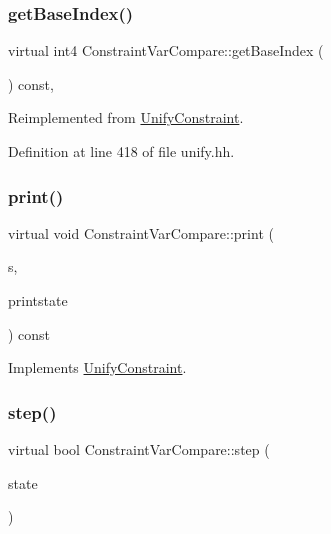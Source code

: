 \subsubsection{\texorpdfstring{getBaseIndex()}{getBaseIndex()}}
{\footnotesize\ttfamily virtual int4 Constraint\+Var\+Compare\+::get\+Base\+Index (\begin{DoxyParamCaption}\item[{void}]{ }\end{DoxyParamCaption}) const\hspace{0.3cm}{\ttfamily [inline]}, {\ttfamily [virtual]}}



Reimplemented from \mbox{\hyperlink{class_unify_constraint_a44f0164f38ac1fdc44fc73ebe7678de1}{Unify\+Constraint}}.



Definition at line 418 of file unify.\+hh.

\mbox{\label{class_constraint_var_compare_ac79fc149c90e867dc3138c186b979b68}} 
\subsubsection{\texorpdfstring{print()}{print()}}
{\footnotesize\ttfamily virtual void Constraint\+Var\+Compare\+::print (\begin{DoxyParamCaption}\item[{ostream \&}]{s,  }\item[{\mbox{\hyperlink{class_unify_c_printer}{Unify\+C\+Printer}} \&}]{printstate }\end{DoxyParamCaption}) const\hspace{0.3cm}{\ttfamily [virtual]}}



Implements \mbox{\hyperlink{class_unify_constraint_a774f6a611a96384766cb8e8d8f5ff41f}{Unify\+Constraint}}.

\mbox{\label{class_constraint_var_compare_a730b6edfacbee486efdea1e91b6509cd}} 
\subsubsection{\texorpdfstring{step()}{step()}}
{\footnotesize\ttfamily virtual bool Constraint\+Var\+Compare\+::step (\begin{DoxyParamCaption}\item[{\mbox{\hyperlink{class_unify_state}{Unify\+State}} \&}]{state }\end{DoxyParamCaption})\hspace{0.3cm}{\ttfamily [virtual]}}



